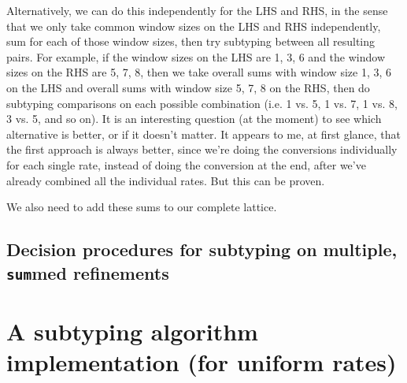 \documentclass[acmsmall,nonacm,screen]{acmart}
\begin{document}
Alternatively, we can do this independently for the LHS and RHS, in the sense that we only take common window sizes on the LHS and RHS independently, sum for each of those window sizes, then try subtyping between all resulting pairs. For example, if the window sizes on the LHS are 1, 3, 6 and the window sizes on the RHS are 5, 7, 8, then we take overall sums with window size 1, 3, 6 on the LHS and overall sums with window size 5, 7, 8 on the RHS, then do subtyping comparisons on each possible combination (i.e. 1 vs. 5, 1 vs. 7, 1 vs. 8, 3 vs. 5, and so on). It is an interesting question (at the moment) to see which alternative is better, or if it doesn't matter. It appears to me, at first glance, that the first approach is always better, since we're doing the conversions individually for each single rate, instead of doing the conversion at the end, after we've already combined all the individual rates. But this can be proven.

We also need to add these sums to our complete lattice.
\subsection{Decision procedures for subtyping on multiple, \texttt{sum}med refinements}


\section{A subtyping algorithm implementation (for uniform rates)}
\end{document}

